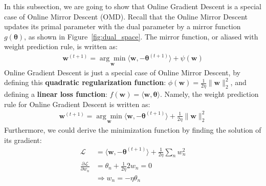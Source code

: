 \documentclass[11pt]{article}
\newcommand{\btheta}{\boldsymbol{\theta}}
\newcommand{\bw}{\boldsymbol{w}}
\begin{document}
In this subsection, we are going to show that Online Gradient Descent is a special case of Online Mirror Descent (OMD). Recall that the Online Mirror Descent updates its primal parameter with the dual parameter by a mirror function $g(\btheta)$, as shown in Figure~\ref{fig:dual_space}. The mirror function, or aliased with weight prediction rule, is written as: 
%
\begin{equation*}
\begin{split}
\bw^{(t+1)} = \underset{\bw}{\arg\min} \langle \bw,-\btheta^{(t+1)} \rangle
+\psi(\bw)
\end{split}
\end{equation*}
%
Online Gradient Descent is just a special case of Online Mirror Descent, by defining 
this \textbf{quadratic regularization function}: $\phi(\bw) = \frac{1}{2\eta}\|\bw\|^2_2$, and defining a \textbf{linear loss function}: $f(\bw)=\langle \bw, \btheta \rangle$. Namely, the weight prediction rule for Online Gradient Descent is written as:
%
\begin{equation*}
\begin{split}
\bw^{(t+1)} = \underset{\bw}{\arg\min} \langle \bw,-\btheta^{(t+1)} \rangle
+\frac{1}{2\eta}\|\bw\|^2_2
\end{split}
\end{equation*}
%
Furthermore, we could derive the minimization function by finding the solution of its gradient:
\begin{equation*}
\begin{split}
\mathcal{L} &= \langle \bw,-\btheta^{(t+1)} \rangle
+\frac{1}{2\eta}\sum_n w^2_n \\
\frac{\partial\mathcal{L}}{\partial w_n}
&= \theta_n + \frac{1}{2\eta} 2w_n = 0 \\
&\Rightarrow w_n = -\eta \theta_n
\end{split}
\end{equation*}
\end{document}
